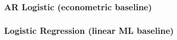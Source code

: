 \documentclass[12pt,a4paper,oneside]{article}
\begin{document}
%
%


\subsubsection{AR Logistic (econometric baseline)}\label{subsubsec:ar}



\subsubsection{Logistic Regression (linear ML baseline)}\label{subsubsec:lr}

\end{document}
